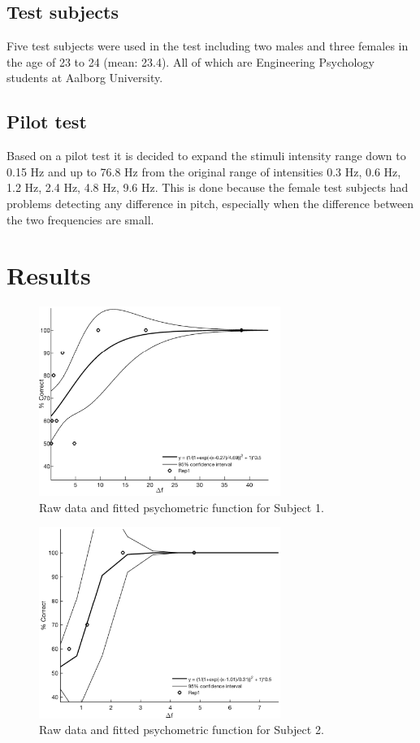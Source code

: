 \subsection*{Test subjects}
%
Five test subjects were used in the test including two males and three females in the age of 23 to 24 (mean: 23.4). All of which are Engineering Psychology students at Aalborg University.

\subsection*{Pilot test}
%
Based on a pilot test it is decided to expand the stimuli intensity range down to 0.15 Hz and up to 76.8 Hz from the original range of intensities 0.3 Hz, 0.6 Hz, 1.2 Hz, 2.4 Hz, 4.8 Hz, 9.6 Hz. This is done because the female test subjects had problems detecting any difference in pitch, especially when the difference between the two frequencies are small.

\section*{Results}
%
\begin{figure}[H]
\centering
\includegraphics[width = 0.7\textwidth]{Figure/Vores_Figurer/Subject1} 
\caption{Raw data and fitted psychometric function for Subject 1.}
\label{fig:Subject1}
\end{figure}

\begin{figure}[H]
\centering
\includegraphics[width = 0.7\textwidth]{Figure/Vores_Figurer/Subject2} 
\caption{Raw data and fitted psychometric function for Subject 2.}
\label{fig:Subject2}
\end{figure}

